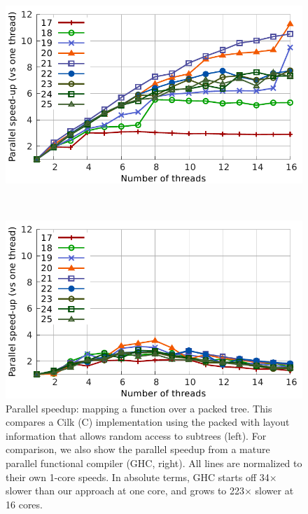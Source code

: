 \documentclass[a4paper,english]{lipics-v2016}
\begin{document}
\begin{figure}[t]
  \vspace{-5mm}
\begin{minipage}{1.04\textwidth}
  \begin{minipage}{.49\textwidth}
    \centering
    \includegraphics[width=\textwidth]{./figs/speedup_cilk.pdf}
  \end{minipage}
  $ $ 
  \begin{minipage}{.49\textwidth}
    \centering
    \includegraphics[width=\textwidth]{./figs/speedup_ghc.pdf}
  \end{minipage}
\end{minipage}
   \caption{Parallel speedup: mapping a function over a packed tree.  This
     compares a Cilk (C) implementation using the packed with layout information
     that allows random access to subtrees (left).  For comparison, we also show
     the parallel speedup from a mature parallel functional compiler (GHC,
     right).  All lines are normalized to their own 1-core speeds.  In absolute
     terms, GHC starts off 34$\times$ slower than our approach at one core, and
     grows to 223$\times$ slower at 16 cores.}
   \label{fig:par-shootout}
      \vspace{-4mm}
\end{figure}
\end{document}
